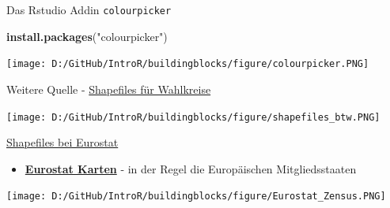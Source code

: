 \documentclass[ignorenonframetext,]{beamer}
\newenvironment{Shaded}{\begin{snugshade}}{\end{snugshade}}
\newcommand{\KeywordTok}[1]{\textcolor[rgb]{0.26,0.66,0.93}{\textbf{#1}}}
\newcommand{\NormalTok}[1]{\textcolor[rgb]{0.74,0.68,0.62}{#1}}
\newcommand{\StringTok}[1]{\textcolor[rgb]{0.02,0.61,0.04}{#1}}
\providecommand{\tightlist}{%
  \setlength{\itemsep}{0pt}\setlength{\parskip}{0pt}}
\begin{document}
\begin{frame}[fragile]{Das Rstudio Addin \texttt{colourpicker}}
\protect\hypertarget{das-rstudio-addin-colourpicker}{}

\begin{Shaded}
\begin{Highlighting}[]
\KeywordTok{install.packages}\NormalTok{(}\StringTok{"colourpicker"}\NormalTok{)}
\end{Highlighting}
\end{Shaded}

\texttt{[image: D:/GitHub/IntroR/buildingblocks/figure/colourpicker.PNG]}

\end{frame}

\begin{frame}{Weitere Quelle -
\href{https://www.bundeswahlleiter.de/bundestagswahlen/2017/wahlkreiseinteilung/downloads.html}{Shapefiles
für Wahlkreise}}
\protect\hypertarget{weitere-quelle---shapefiles-fur-wahlkreise}{}

\texttt{[image: D:/GitHub/IntroR/buildingblocks/figure/shapefiles\_btw.PNG]}

\end{frame}

\begin{frame}{\href{http://ec.europa.eu/eurostat/de/web/gisco/geodata/reference-data/administrative-units-statistical-units}{Shapefiles
bei Eurostat}}
\protect\hypertarget{shapefiles-bei-eurostat}{}

\begin{itemize}
\tightlist
\item
  \href{http://epp.eurostat.ec.europa.eu/portal/page/portal/gisco_Geographical_information_maps/popups/\%20references/administrative_units_statistical_units_1}{\textbf{Eurostat
  Karten}} - in der Regel die Europäischen Mitgliedsstaaten
\end{itemize}

\texttt{[image: D:/GitHub/IntroR/buildingblocks/figure/Eurostat\_Zensus.PNG]}

\end{frame}
\end{document}
